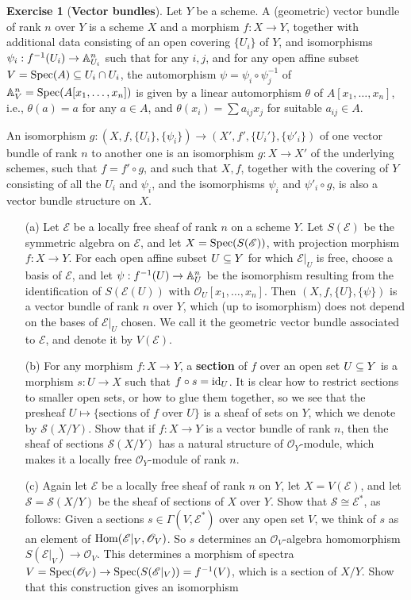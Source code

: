 \documentclass[11pt]{book}
\theoremstyle{definition}
\newtheorem{exercise}{Exercise}[section]
\begin{document}
\begin{exercise}[\textbf{Vector bundles}]
Let $Y$ be a scheme. A (geometric) vector bundle of rank $n$ over $Y$ is a scheme $X$ and a morphism $f:X\to Y$, together with additional data consisting of an open covering $\{U_i\}$ of $Y$, and isomorphisms $\psi_i:f^{-1}(U_i)\to\mathbb{A}_{U_i}^n$ such that for any $i,j$, and for any open affine subset $V=\mathrm{Spec}(A)\subseteq U_i\cap U_i$, the automorphism $\psi=\psi_i\circ\psi_j^{-1}$ of $\mathbb{A}^n_V=\mathrm{Spec}(A[x_1,\dots,x_n])$ is given by a linear automorphism $\theta$ of $A[x_1,\dots,x_n]$, i.e., $\theta(a)=a$ for any $a\in A$, and $\theta(x_i)=\sum a_{ij}x_j$ for suitable $a_{ij}\in A$.\par
An isomorphism $g:(X,f,\{U_i\},\{\psi_i\})\to(X',f',\{U_i'\},\{\psi'_i\})$ of one vector bundle of rank $n$ to another one is an isomorphism $g:X\to X'$ of the underlying schemes, such that $f=f'\circ g$, and such that $X,f$, together with the covering of $Y$ consisting of all the $U_i$ and $\psi_i$, and the isomorphisms $\psi_i$ and $\psi'_i\circ g$, is also a vector bundle structure on $X$.
\begin{itemize}
\item[(a)] Let $\mathscr{E}$ be a locally free sheaf of rank $n$ on a scheme $Y$. Let $S(\mathscr{E})$ be the symmetric algebra on $\mathscr{E}$, and let $X=\mathrm{Spec}(S(\mathscr{E}))$, with projection morphism $f:X\to Y$. For each open affine subset $U\subseteq Y$ for which $\mathscr{E}|_U$ is free, choose a basis of $\mathscr{E}$, and let $\psi:f^{-1}(U)\to\mathbb{A}_U^n$ be the isomorphism resulting from the identification of $S(\mathscr{E}(U))$ with $\mathscr{O}_U[x_1,\dots,x_n]$. Then $(X,f,\{U\},\{\psi\})$ is a vector bundle of rank $n$ over $Y$, which (up to isomorphism) does not depend on the bases of $\mathscr{E}|_U$ chosen. We call it the geometric vector bundle associated to $\mathscr{E}$, and denote it by $V(\mathscr{E})$.
\item[(b)] For any morphism $f:X\to Y$, a \textbf{section} of $f$ over an open set $U\subseteq Y$ is a morphism $s:U\to X$ such that $f\circ s=\mathrm{id}_U$. It is clear how to restrict sections to smaller open sets, or how to glue them together, so we see that the presheaf $U\mapsto\{\text{sections of $f$ over $U$}\}$ is a sheaf of sets on $Y$, which we denote by $\mathscr{S}(X/Y)$. Show that if $f:X\to Y$ is a vector bundle of rank $n$, then the sheaf of sections $\mathscr{S}(X/Y)$ has a natural structure of $\mathscr{O}_Y$-module, which makes it a locally free $\mathscr{O}_Y$-module of rank $n$.
\item[(c)] Again let $\mathscr{E}$ be a locally free sheaf of rank $n$ on $Y$, let $X=V(\mathscr{E})$, and let $\mathscr{S}=\mathscr{S}(X/Y)$ be the sheaf of sections of $X$ over $Y$. Show that $\mathscr{S}\cong\mathscr{E}^*$, as follows: Given a sections $s\in\Gamma(V,\mathscr{E}^*)$ over any open set $V$, we think of $s$ as an element of $\mathrm{Hom}(\mathscr{E}|_V,\mathscr{O}_V)$. So $s$ determines an $\mathscr{O}_V$-algebra homomorphism $S(\mathscr{E}|_V)\to\mathscr{O}_V$. This determines a morphism of spectra $V=\mathrm{Spec}(\mathscr{O}_V)\to\mathrm{Spec}(S(\mathscr{E}|_V))=f^{-1}(V)$, which is a section of $X/Y$. Show that this construction gives an isomorphism

\end{itemize}
\end{exercise}
\end{document}

